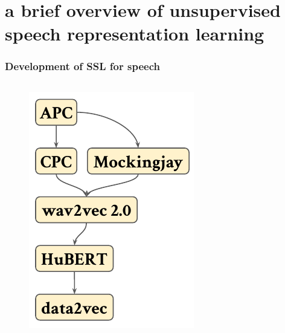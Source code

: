 
\section{a brief overview of unsupervised speech representation learning}

\begin{frame}
    \frametitle{Development of SSL for speech}
    \begingroup
    \small%
    \begin{columns}[t]
        \hspace{0.025\textwidth}
        \begin{column}{0.20\textwidth}
            \begin{figure}[\textwidth]
                \centering
                \includegraphics[width=\textwidth]{figures/brief-flow-0.pdf}

\end{figure}
\end{column}
\end{columns}
\end{frame}
